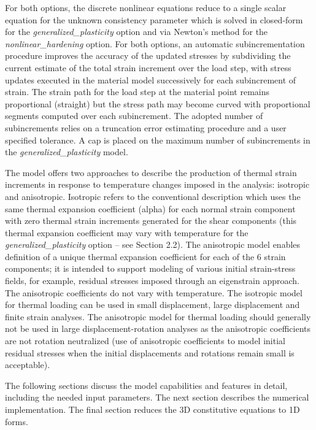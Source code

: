 \documentclass[11pt]{report}
\numberwithin{equation}{section}
\begin{document}
For both options, the discrete nonlinear equations reduce to a single scalar 
equation for the unknown consistency parameter which is solved in closed-form 
for the \textit{generalized\_plasticity } option and via Newton's method for the 
\textit{nonlinear\_hardening} option. For both options, an automatic 
subincrementation procedure 
improves the accuracy of the updated stresses by subdividing the current 
estimate of the total strain increment over the load step, with stress 
updates executed in the material model successively for each subincrement 
of strain. The strain path for the load step at the material point 
remains proportional (straight) but the stress path may become 
curved with proportional segments computed over each subincrement. The 
adopted number of subincrements relies on a truncation error estimating 
procedure and a user specified tolerance. A cap is placed on the 
maximum number of subincrements in the \textit{generalized\_plasticity} model.

The model offers two approaches to describe the production of thermal strain 
increments in response to temperature changes imposed in the analysis: 
isotropic and anisotropic. Isotropic refers to the conventional description 
which uses the same thermal expansion coefficient (alpha) for each 
normal strain component with zero thermal strain increments generated 
for the shear components (this thermal expansion coefficient 
may vary with temperature for the
\textit{generalized\_plasticity} option -- see Section 2.2). The anisotropic model enables 
definition of a unique thermal expansion 
coefficient for each of the 6 strain components; it is intended to 
support modeling of various initial strain-stress fields, for example, residual 
stresses imposed through an eigenstrain approach. The anisotropic coefficients 
do not vary with temperature. The isotropic model for thermal loading can 
be used in small displacement, large displacement and finite strain analyses. 
The anisotropic model for thermal loading should generally not 
be used in large displacement-rotation analyses as the anisotropic 
coefficients are not rotation neutralized (use of anisotropic 
coefficients to model initial residual stresses 
when the initial displacements and rotations remain small is acceptable).

The following sections discuss the model capabilities and features in detail, 
including the needed input parameters. The 
next section describes the numerical implementation. The final 
section reduces the 3D constitutive equations to 1D forms.
\end{document}
